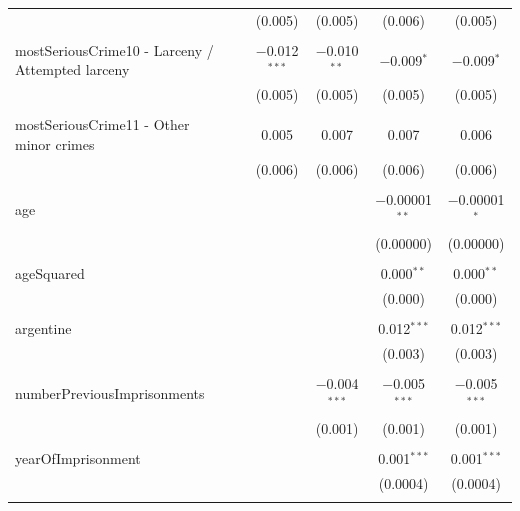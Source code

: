 \documentclass[a4paper,12pt]{article}
\begin{document}
\begin{table}[!htbp]
{\begin{tabular}{@{\extracolsep{5pt}}lccccc}
  &  & (0.005) & (0.005) & (0.006) & (0.005) \\ 
  & & & & & \\ 
 mostSeriousCrime10 - Larceny / Attempted larceny &  & $-$0.012$^{***}$ & $-$0.010$^{**}$ & $-$0.009$^{*}$ & $-$0.009$^{*}$ \\ 
  &  & (0.005) & (0.005) & (0.005) & (0.005) \\ 
  & & & & & \\ 
 mostSeriousCrime11 - Other minor crimes &  & 0.005 & 0.007 & 0.007 & 0.006 \\ 
  &  & (0.006) & (0.006) & (0.006) & (0.006) \\ 
  & & & & & \\ 
 age &  &  &  & $-$0.00001$^{**}$ & $-$0.00001$^{*}$ \\ 
  &  &  &  & (0.00000) & (0.00000) \\ 
  & & & & & \\ 
 ageSquared &  &  &  & 0.000$^{**}$ & 0.000$^{**}$ \\ 
  &  &  &  & (0.000) & (0.000) \\ 
  & & & & & \\ 
 argentine &  &  &  & 0.012$^{***}$ & 0.012$^{***}$ \\ 
  &  &  &  & (0.003) & (0.003) \\ 
  & & & & & \\ 
 numberPreviousImprisonments &  &  & $-$0.004$^{***}$ & $-$0.005$^{***}$ & $-$0.005$^{***}$ \\ 
  &  &  & (0.001) & (0.001) & (0.001) \\ 
  & & & & & \\ 
 yearOfImprisonment &  &  &  & 0.001$^{***}$ & 0.001$^{***}$ \\ 
  &  &  &  & (0.0004) & (0.0004) \\ 
  & & & & & \\ 
  

\end{tabular}}
\end{table}
\end{document}
